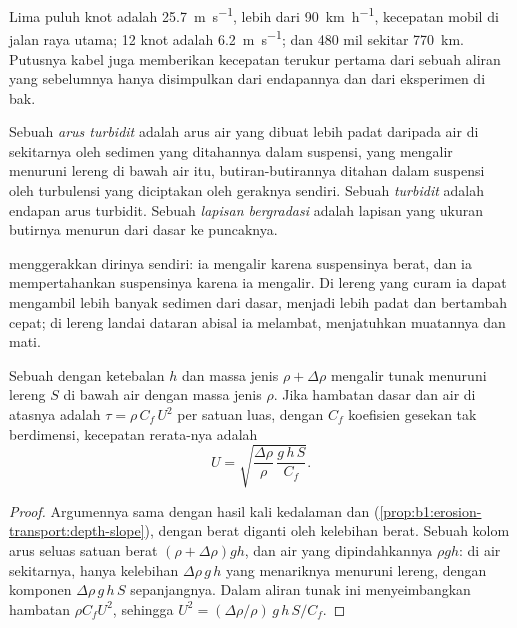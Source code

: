 Lima puluh knot adalah \qty{25.7}{m.s^{-1}}, lebih dari \qty{90}{km.h^{-1}}, kecepatan mobil di jalan raya utama; 12 knot adalah \qty{6.2}{m.s^{-1}}; dan 480 mil sekitar \qty{770}{km}. Putusnya kabel juga memberikan kecepatan terukur pertama dari sebuah aliran yang sebelumnya hanya disimpulkan dari endapannya dan dari eksperimen di bak.

\begin{definition}\label{def:b1:clastic-sediments:turbidite}
Sebuah \emph{arus turbidit} adalah arus air yang dibuat lebih padat daripada air di sekitarnya oleh sedimen yang ditahannya dalam suspensi, yang mengalir menuruni lereng di bawah air itu, butiran-butirannya ditahan dalam suspensi oleh turbulensi yang diciptakan oleh geraknya sendiri. Sebuah \emph{turbidit} adalah endapan arus turbidit. Sebuah \emph{lapisan bergradasi} adalah lapisan yang ukuran butirnya menurun dari dasar ke puncaknya.
\end{definition}

 menggerakkan dirinya sendiri: ia mengalir karena suspensinya berat, dan ia mempertahankan suspensinya karena ia mengalir. Di lereng yang curam ia dapat mengambil lebih banyak sedimen dari dasar, menjadi lebih padat dan bertambah cepat; di lereng landai dataran abisal ia melambat, menjatuhkan muatannya dan mati.

\begin{proposition}\label{prop:b1:clastic-sediments:turbidity}
Sebuah  dengan ketebalan $h$ dan massa jenis $\rho + \Delta\rho$ mengalir tunak menuruni lereng $S$ di bawah air dengan massa jenis $\rho$. Jika hambatan dasar dan air di atasnya adalah $\tau = \rho\,C_f\,U^2$ per satuan luas, dengan $C_f$ koefisien gesekan tak berdimensi, kecepatan rerata-nya adalah
\[
  U = \sqrt{\frac{\Delta\rho}{\rho}\,\frac{g\,h\,S}{C_f}} .
\]
\end{proposition}

\begin{proof}
Argumennya sama dengan hasil kali kedalaman dan 
(\cref{prop:b1:erosion-transport:depth-slope}), dengan berat diganti oleh kelebihan berat. Sebuah kolom arus seluas satuan berat $(\rho +
\Delta\rho) g h$, dan air yang dipindahkannya $\rho g h$: di air sekitarnya, hanya kelebihan $\Delta\rho\,g\,h$ yang menariknya menuruni lereng, dengan
komponen $\Delta\rho\,g\,h\,S$ sepanjangnya. Dalam aliran tunak ini menyeimbangkan
hambatan $\rho C_f U^2$, sehingga $U^2 = (\Delta\rho/\rho)\,g\,h\,S/C_f$.
\end{proof}

